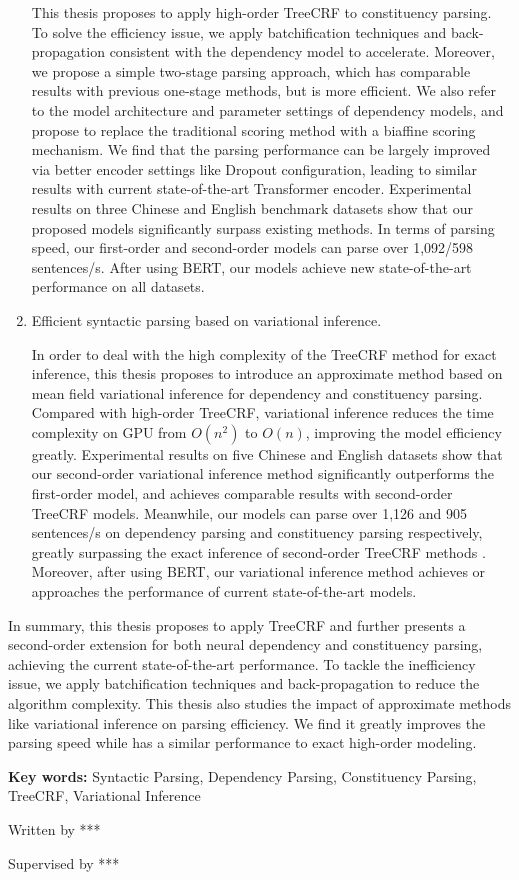 \begin{eabstract}
\begin{enumerate}
		      This thesis proposes to apply high-order TreeCRF to constituency parsing.
		      To solve the efficiency issue, we apply batchification techniques and back-propagation consistent with the dependency model to accelerate.
		      Moreover, we propose a simple two-stage parsing approach, which has comparable results with previous one-stage methods, but is more efficient.
		      We also refer to the model architecture and parameter settings of dependency models, and propose to replace the traditional scoring method with a biaffine scoring mechanism.
		      We find that the parsing performance can be largely improved via better encoder settings like Dropout configuration, leading to similar results with current state-of-the-art Transformer encoder.
		      Experimental results on three Chinese and English benchmark datasets show that our proposed models significantly surpass existing methods.
		      In terms of parsing speed, our first-order and second-order models can parse over 1,092/598 sentences/s.
		      After using BERT, our models achieve new state-of-the-art performance on all datasets.

		\item Efficient syntactic parsing based on variational inference.

		      In order to deal with the high complexity of the TreeCRF method for exact inference, this thesis proposes to introduce an approximate method based on mean field variational inference for dependency and constituency parsing.
		      Compared with high-order TreeCRF, variational inference reduces the time complexity on GPU from $O(n^2)$ to $O(n)$, improving the model efficiency greatly.
		      Experimental results on five Chinese and English datasets show that our second-order variational inference method significantly outperforms the first-order model, and achieves comparable results with second-order TreeCRF models.
		      Meanwhile, our models can parse over 1,126 and 905 sentences/s on dependency parsing and constituency parsing respectively, greatly surpassing the exact inference of second-order TreeCRF methods .
		      Moreover, after using BERT, our variational inference method achieves or approaches the performance of current state-of-the-art models.

	\end{enumerate}

	In summary, this thesis proposes to apply TreeCRF and further presents a second-order extension for both neural dependency and constituency parsing, achieving the current state-of-the-art performance.
	To tackle the inefficiency issue, we apply batchification techniques and back-propagation to reduce the algorithm complexity.
	This thesis also studies the impact of approximate methods like variational inference on parsing efficiency.
	We find it greatly improves the parsing speed while has a similar performance to exact high-order modeling.

	\vskip 21bp
		{\bf{} Key words: }
	Syntactic Parsing,
	Dependency Parsing,
	Constituency Parsing,
	TreeCRF,
	Variational Inference
\end{eabstract}

\begin{flushright}
	Written by ***

	Supervised by ***
\end{flushright}
